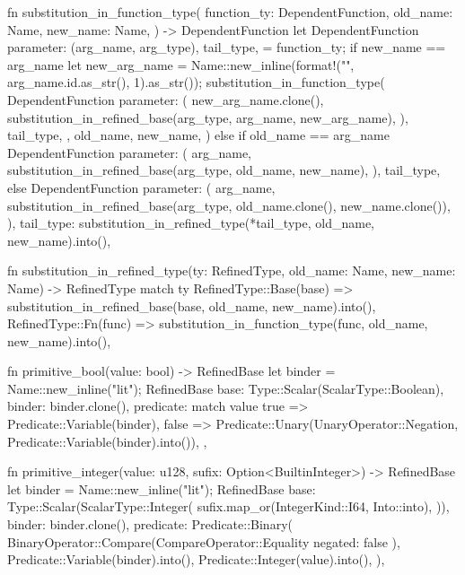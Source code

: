 \documentclass[
  oneside,
  english,
  coorientadorbanca,
  noabntexcite
]{ufsc-thesis-rn46-2019}
\begin{document}
\begin{rustcode}
fn substitution_in_function_type(
    function_ty: DependentFunction,
    old_name: Name,
    new_name: Name,
) -> DependentFunction {
    let DependentFunction {
        parameter: (arg_name, arg_type),
        tail_type,
    } = function_ty;
    if new_name == arg_name {
        let new_arg_name = Name::new_inline(format!("{}{}", arg_name.id.as_str(), 1).as_str());
        substitution_in_function_type(
            DependentFunction {
                parameter: (
                    new_arg_name.clone(),
                    substitution_in_refined_base(arg_type, arg_name, new_arg_name),
                ),
                tail_type,
            },
            old_name,
            new_name,
        )
    } else if old_name == arg_name {
        DependentFunction {
            parameter: (
                arg_name,
                substitution_in_refined_base(arg_type, old_name, new_name),
            ),
            tail_type,
        }
    } else {
        DependentFunction {
            parameter: (
                arg_name,
                substitution_in_refined_base(arg_type, old_name.clone(), new_name.clone()),
            ),
            tail_type: substitution_in_refined_type(*tail_type, old_name, new_name).into(),
        }
    }
}

fn substitution_in_refined_type(ty: RefinedType, old_name: Name, new_name: Name) -> RefinedType {
    match ty {
        RefinedType::Base(base) => substitution_in_refined_base(base, old_name, new_name).into(),
        RefinedType::Fn(func) => substitution_in_function_type(func, old_name, new_name).into(),
    }
}

fn primitive_bool(value: bool) -> RefinedBase {
    let binder = Name::new_inline("lit");
    RefinedBase {
        base: Type::Scalar(ScalarType::Boolean),
        binder: binder.clone(),
        predicate: match value {
            true => Predicate::Variable(binder),
            false => Predicate::Unary(UnaryOperator::Negation, Predicate::Variable(binder).into()),
        },
    }
}

fn primitive_integer(value: u128, sufix: Option<BuiltinInteger>) -> RefinedBase {
    let binder = Name::new_inline("lit");
    RefinedBase {
        base: Type::Scalar(ScalarType::Integer(
            sufix.map_or(IntegerKind::I64, Into::into),
        )),
        binder: binder.clone(),
        predicate: Predicate::Binary(
            BinaryOperator::Compare(CompareOperator::Equality { negated: false }),
            Predicate::Variable(binder).into(),
            Predicate::Integer(value).into(),
        ),
    }
}


\end{rustcode}
\end{document}
